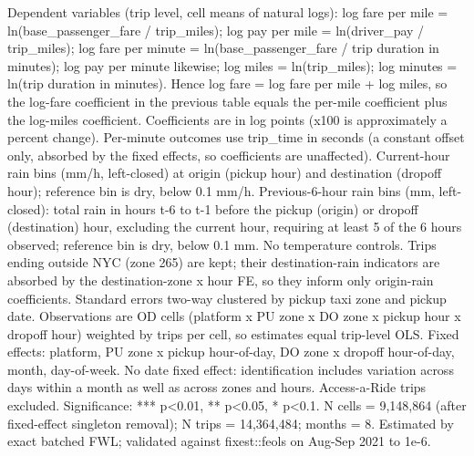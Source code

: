 \par \raggedright 
Dependent variables (trip level, cell means of natural logs): log fare per mile = ln(base\_passenger\_fare / trip\_miles); log pay per mile = ln(driver\_pay / trip\_miles); log fare per minute = ln(base\_passenger\_fare / trip duration in minutes); log pay per minute likewise; log miles = ln(trip\_miles); log minutes = ln(trip duration in minutes). Hence log fare = log fare per mile + log miles, so the log-fare coefficient in the previous table equals the per-mile coefficient plus the log-miles coefficient. Coefficients are in log points (x100 is approximately a percent change). Per-minute outcomes use trip\_time in seconds (a constant offset only, absorbed by the fixed effects, so coefficients are unaffected). Current-hour rain bins (mm/h, left-closed) at origin (pickup hour) and destination (dropoff hour); reference bin is dry, below 0.1 mm/h. Previous-6-hour rain bins (mm, left-closed): total rain in hours t-6 to t-1 before the pickup (origin) or dropoff (destination) hour, excluding the current hour, requiring at least 5 of the 6 hours observed; reference bin is dry, below 0.1 mm. No temperature controls. Trips ending outside NYC (zone 265) are kept; their destination-rain indicators are absorbed by the destination-zone x hour FE, so they inform only origin-rain coefficients. Standard errors two-way clustered by pickup taxi zone and pickup date. Observations are OD cells (platform x PU zone x DO zone x pickup hour x dropoff hour) weighted by trips per cell, so estimates equal trip-level OLS. Fixed effects: platform, PU zone x pickup hour-of-day, DO zone x dropoff hour-of-day, month, day-of-week. No date fixed effect: identification includes variation across days within a month as well as across zones and hours. Access-a-Ride trips excluded. Significance: *** p<0.01, ** p<0.05, * p<0.1. N cells = 9,148,864 (after fixed-effect singleton removal); N trips = 14,364,484; months = 8. Estimated by exact batched FWL; validated against fixest::feols on Aug-Sep 2021 to 1e-6.
\par\endgroup
\ifdefined\ifclassloaded
{}
\fi
